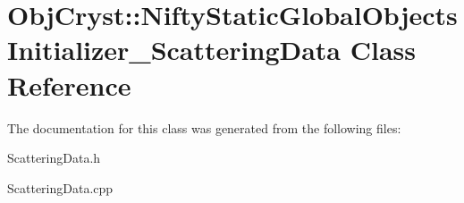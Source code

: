 \hypertarget{class_obj_cryst_1_1_nifty_static_global_objects_initializer___scattering_data}{}\section{Obj\+Cryst\+::Nifty\+Static\+Global\+Objects\+Initializer\+\_\+\+Scattering\+Data Class Reference}
\label{class_obj_cryst_1_1_nifty_static_global_objects_initializer___scattering_data}


The documentation for this class was generated from the following files\+:\begin{DoxyCompactItemize}
\item 
Scattering\+Data.\+h\item 
Scattering\+Data.\+cpp\end{DoxyCompactItemize}

